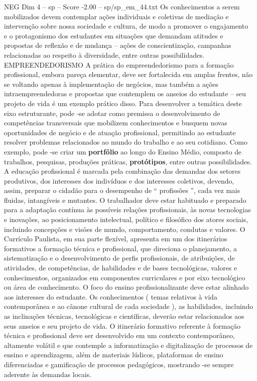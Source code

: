 \begin{textsample}{NEG Dim 4 – sp – Score -2.00 – sp/sp\_em\_44.txt}
Os conhecimentos a serem mobilizados devem contemplar ações individuais e coletivas de mediação e intervenção sobre nossa sociedade e cultura, de modo a promover o engajamento e o protagonismo dos estudantes em situações que demandam atitudes e propostas de reflexão e de mudança – ações de conscientização, campanhas relacionadas ao respeito à diversidade, entre outras possibilidades.
EMPREENDEDORISMO A prática do empreendedorismo para a formação profissional, embora pareça elementar, deve ser fortalecida em amplas frentes, não se voltando apenas à implementação de negócios, mas também a ações intraempreendedoras e propostas que contemplem os anseios do estudante – seu projeto de vida é um exemplo prático disso.
Para desenvolver a temática deste eixo estruturante, pode -se adotar como premissa o desenvolvimento de competências transversais que mobilizem conhecimentos e busquem novas oportunidades de negócio e de atuação profissional, permitindo ao estudante resolver problemas relacionados ao mundo do trabalho e ao seu cotidiano.
Como exemplo, pode -se criar um \textbf{portfólio} ao longo do Ensino Médio, composto de trabalhos, pesquisas, produções práticas, \textbf{protótipos}, entre outras possibilidades.
A educação profissional é marcada pela combinação das demandas dos setores produtivos, dos interesses dos indivíduos e dos interesses coletivos, devendo, assim, preparar o cidadão para o desempenho de “ profissões ”, cada vez mais fluidas, intangíveis e mutantes.
O trabalhador deve estar habituado e preparado para a adaptação contínua às possíveis relações profissionais, às novas tecnologias e inovações, ao posicionamento intelectual, político e filosófico dos atores sociais, incluindo concepções e visões de mundo, comportamento, condutas e valores.
O Currículo Paulista, em sua parte flexível, apresenta em um dos itinerários formativos a formação técnica e profissional, que direciona o planejamento, a sistematização e o desenvolvimento de perfis profissionais, de atribuições, de atividades, de competências, de habilidades e de bases tecnológicas, valores e conhecimentos, organizados em componentes curriculares e por eixo tecnológico ou área de conhecimento.
O foco do ensino profissionalizante deve estar alinhado aos interesses do estudante.
Os conhecimentos ( temas relativos à vida contemporânea e ao cânone cultural de cada sociedade ), as habilidades, incluindo as inclinações técnicas, tecnológicas e científicas, deverão estar relacionados aos seus anseios e seu projeto de vida.
O itinerário formativo referente à formação técnica e profissional deve ser desenvolvido em um contexto contemporâneo, altamente volátil e que contemple a informatização e digitalização de processos de ensino e aprendizagem, além de materiais lúdicos, plataformas de ensino diferenciadas e gamificação de processos pedagógicos, mostrando -se sempre aderente às demandas locais.

\end{textsample}
